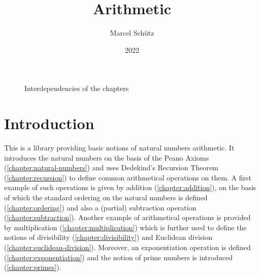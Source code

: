 \documentclass[12pt,oneside]{book}
\title{Arithmetic}
\author{Marcel Schütz}
\date{2022}
\begin{document}
  \maketitle

  \tableofcontents

  \paragraph*{}
  \begin{figure}[H]
    \centering
    \caption*{Interdependencies of the chapters}
  \end{figure}


  \section*{Introduction}

  This is a library providing basic notions of natural numbers arithmetic.
  It introduces the natural numbers on the basis of the Peano
  Axioms (\cref{chapter:natural-numbers}) and uses Dedekind's Recursion Theorem
  (\cref{chapter:recursion}) to define common arithmetical operations on them.
  A first example of such operations is given by addition
  (\cref{chapter:addition}), on the basis of which the standard ordering on the
  natural numbers is defined (\cref{chapter:ordering}) and also a (partial)
  subtraction operation (\cref{chapter:subtraction}).
  Another example of arithmetical operations is provided by multiplication
  (\cref{chapter:multiplication}) which is further used to define the notions of
  divisibility (\cref{chapter:divisibility}) and Euclidean division
  (\cref{chapter:euclidean-division}).
  Moreover, an exponentiation operation is defined
  (\cref{chapter:exponentiation}) and the notion of prime numbers is introduced
  (\cref{chapter:primes}).
\end{document}
